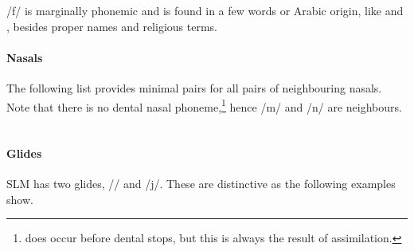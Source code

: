 
/f/ is marginally phonemic and is found in a few words or Arabic origin, like  and , besides proper names and religious terms.


\paragraph{Nasals} The following list provides minimal pairs for all pairs of neighbouring nasals. Note that there is no dental nasal phoneme,\footnote{ does occur before dental stops, but this is always the result of assimilation.} hence /m/ and /n/ are neighbours.\\

\\
 
\paragraph{Glides}
SLM has two glides, /\V/ and /j/. These are distinctive as the following examples show.\\


